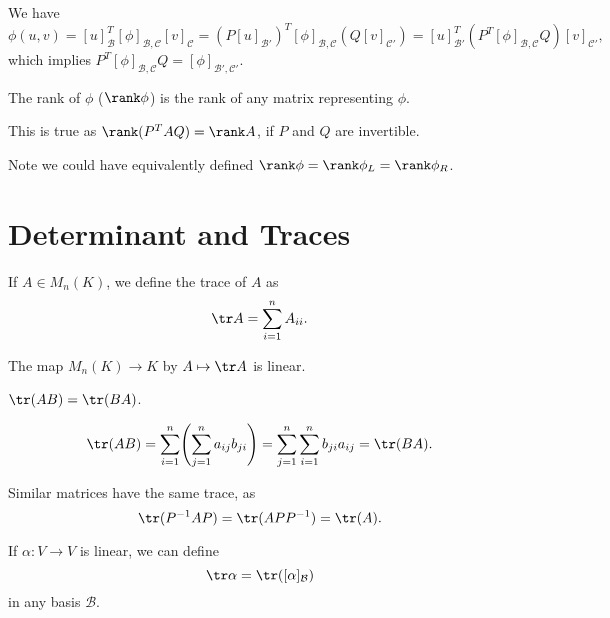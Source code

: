 \documentclass[12pt]{article}
\begin{document}
\begin{proofbox}
	We have
\[
	\phi(u, v) = [u]_{\mathcal{B}}^{T} [\phi]_{\mathcal{B}, \mathcal{C}}[v]_{\mathcal{C}} = (P[u]_{\mathcal{B}'})^{T}[\phi]_{\mathcal{B},\mathcal{C}}(Q[v]_{\mathcal{C}'}) = [u]_{\mathcal{B}'}^{T} (P^{T} [\phi]_{\mathcal{B}, \mathcal{C}} Q)[v]_{\mathcal{C}'}
,\]
which implies $P^{T}[\phi]_{\mathcal{B}, \mathcal{C}}Q = [\phi]_{\mathcal{B}', \mathcal{C}'}$.
\end{proofbox}

\begin{definition}
	The rank of $\phi$ ($\rank \phi$) is the rank of any matrix representing $\phi$.
\end{definition}

This is true as $\rank (P^{T}AQ) = \rank A$, if $P$ and $Q$ are invertible.

Note we could have equivalently defined $\rank \phi = \rank \phi_L = \rank \phi_R$.

\newpage

\section{Determinant and Traces}%
\label{sec:determinant_and_traces}

\begin{definition}
	If $A \in M_{n}(K)$, we define the trace of $A$ as
	\[
	\tr A = \sum_{i = 1}^{n} A_{ii}
	.\]
\end{definition}

\begin{remark}
	The map $M_n(K) \to K$ by $A \mapsto \tr A$ is linear.
\end{remark}

\begin{lemma}
	$\tr (AB) = \tr (BA)$.
\end{lemma}

\begin{proofbox}
\[
	\tr (AB) = \sum_{i = 1}^{n} \Biggl( \sum_{j = 1}^{n} a_{ij} b_{ji} \Biggr) = \sum_{j = 1}^{n} \sum_{i = 1}^{n} b_{ji} a_{ij} = \tr (BA)
.\]
\end{proofbox}

\begin{corollary}
	Similar matrices have the same trace, as
	\[
		\tr(P^{-1}AP) = \tr(APP^{-1}) = \tr(A)
	.\] 
\end{corollary}

\begin{definition}
	If $\alpha : V \to V$ is linear, we can define
	\[
		\tr \alpha = \tr([\alpha]_{\mathcal{B}})
	\]
	in any basis $\mathcal{B}$.
\end{definition}
\end{document}
